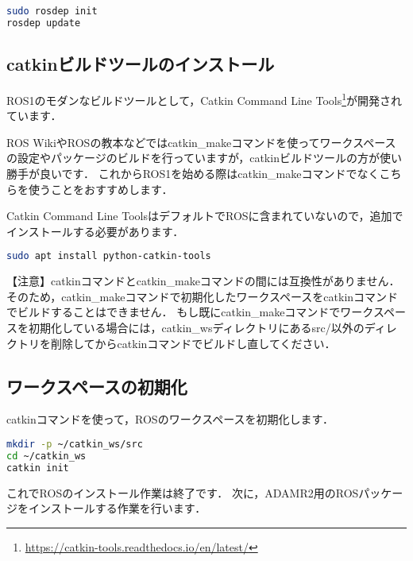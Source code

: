 \documentclass[{../../master}]{subfiles}
\begin{document}
\begin{lstlisting}[language=sh, caption=\textsf{rosdep}のインストール]
sudo rosdep init
rosdep update
\end{lstlisting}

\subsection{\textsf{catkin}ビルドツールのインストール}

ROS1のモダンなビルドツールとして，Catkin Command Line Tools\footnote{\url{https://catkin-tools.readthedocs.io/en/latest/}}が開発されています．

ROS WikiやROSの教本などでは\textsf{catkin\_make}コマンドを使ってワークスペースの設定やパッケージのビルドを行っていますが，\textsf{catkin}ビルドツールの方が使い勝手が良いです．
これからROS1を始める際は\textsf{catkin\_make}コマンドでなくこちらを使うことをおすすめします．

Catkin Command Line ToolsはデフォルトでROSに含まれていないので，追加でインストールする必要があります．

\begin{lstlisting}[language=sh, caption=\textsf{catkin}ビルドツールのインストール]
sudo apt install python-catkin-tools
\end{lstlisting}

\noindent
【注意】\textsf{catkin}コマンドと\textsf{catkin\_make}コマンドの間には互換性がありません．
そのため，\textsf{catkin\_make}コマンドで初期化したワークスペースを\textsf{catkin}コマンドでビルドすることはできません．
もし既に\textsf{catkin\_make}コマンドでワークスペースを初期化している場合には，\textsf{catkin\_ws}ディレクトリにある\textsf{src/}以外のディレクトリを削除してから\textsf{catkin}コマンドでビルドし直してください．

\subsection{ワークスペースの初期化}

\textsf{catkin}コマンドを使って，ROSのワークスペースを初期化します．

\begin{lstlisting}[language=sh, caption=ワークスペースの初期化]
mkdir -p ~/catkin_ws/src
cd ~/catkin_ws
catkin init
\end{lstlisting}

これでROSのインストール作業は終了です．
次に，ADAMR2用のROSパッケージをインストールする作業を行います．
\end{document}

